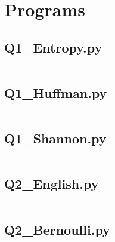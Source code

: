 \documentclass[a4paper]{article}
\begin{document}
\newpage
\newpage
\section*{Programs}

\subsection*{Q1\_Entropy.py}\label{PQ1_Entropy}
\inputminted[frame=none,linenos,framesep=2mm,baselinestretch=1]{python}{Q1_Entropy.py}

\newpage
\subsection*{Q1\_Huffman.py}\label{PQ1_Huffman}
\inputminted[frame=none,linenos,framesep=2mm,baselinestretch=1]{python}{Q1_Huffman.py}

\newpage
\subsection*{Q1\_Shannon.py}\label{PQ1_Shannon}
\inputminted[frame=none,linenos,framesep=2mm,baselinestretch=1]{python}{Q1_Shannon.py}

\newpage
\subsection*{Q2\_English.py}\label{PQ2_English}
\inputminted[frame=none,linenos,framesep=2mm,baselinestretch=1]{python}{Q2_English.py}

\newpage
\subsection*{Q2\_Bernoulli.py}\label{PQ2_Bernoulli}
\inputminted[frame=none,linenos,framesep=2mm,baselinestretch=1]{python}{Q2_Bernoulli.py}

% 
\end{document}
